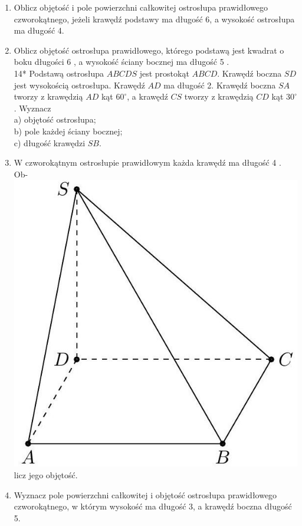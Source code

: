 \documentclass[10pt]{article}
\begin{document}
\begin{enumerate}
  \item Oblicz objętość i pole powierzchni całkowitej ostrosłupa prawidłowego czworokątnego, jeżeli krawędź podstawy ma długość 6, a wysokość ostrosłupa ma długość 4.
  \item Oblicz objętość ostrosłupa prawidłowego, którego podstawą jest kwadrat o boku długości 6 , a wysokość ściany bocznej ma długość 5 .\\
14* Podstawą ostrosłupa \(A B C D S\) jest prostokąt \(A B C D\). Krawędź boczna \(S D\) jest wysokością ostrosłupa. Krawędź \(A D\) ma długość 2. Krawędź boczna \(S A\) tworzy z krawędzią \(A D\) kąt \(60^{\circ}\), a krawędź \(C S\) tworzy z krawędzią \(C D\) kąt \(30^{\circ}\). Wyznacz\\
a) objętość ostrosłupa;\\
b) pole każdej ściany bocznej;\\
c) długość krawędzi \(S B\).
  \item W czworokątnym ostrosłupie prawidłowym każda krawędź ma długość 4 . Ob-\\
\includegraphics[max width=\textwidth, center]{2024_11_21_e9b4faa005d5be2cc318g-088}\\
licz jego objętość.
  \item Wyznacz pole powierzchni całkowitej i objętość ostrosłupa prawidłowego czworokątnego, w którym wysokość ma długość 3, a krawędź boczna długość 5.

\end{enumerate}
\end{document}
